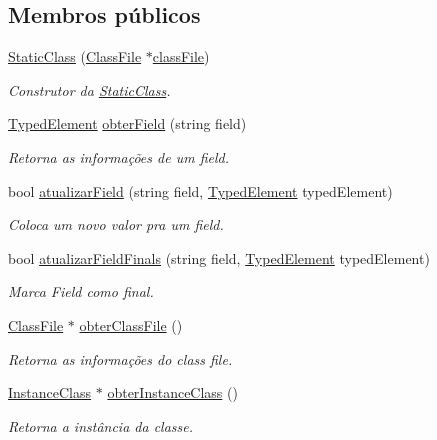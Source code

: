 \subsection*{Membros públicos}
\begin{DoxyCompactItemize}
\item 
\hyperlink{classStaticClass_a6c0e4d8842888a97160f1e815c8e6ac3}{Static\+Class} (\hyperlink{classClassFile}{Class\+File} $\ast$\hyperlink{classStaticClass_a809f1e4dabb3db229a18423f0d0b4a95}{class\+File})
\begin{DoxyCompactList}\small\item\em Construtor da \hyperlink{classStaticClass}{Static\+Class}. \end{DoxyCompactList}\item 
\hyperlink{BasicTypes_8h_a97b332303b1262282599e6ede0637b82}{Typed\+Element} \hyperlink{classStaticClass_ac6d7d4b5b1c315623a8be477c66f38c3}{obter\+Field} (string field)
\begin{DoxyCompactList}\small\item\em Retorna as informações de um field. \end{DoxyCompactList}\item 
bool \hyperlink{classStaticClass_aa0d9a3db46155bf6971476a22c4f2eaa}{atualizar\+Field} (string field, \hyperlink{BasicTypes_8h_a97b332303b1262282599e6ede0637b82}{Typed\+Element} typed\+Element)
\begin{DoxyCompactList}\small\item\em Coloca um novo valor pra um field. \end{DoxyCompactList}\item 
bool \hyperlink{classStaticClass_a4e5d8d70d10266989b2821e10bd8dacc}{atualizar\+Field\+Finals} (string field, \hyperlink{BasicTypes_8h_a97b332303b1262282599e6ede0637b82}{Typed\+Element} typed\+Element)
\begin{DoxyCompactList}\small\item\em Marca Field como final. \end{DoxyCompactList}\item 
\hyperlink{classClassFile}{Class\+File} $\ast$ \hyperlink{classStaticClass_a49b4258a26420be4c6a1a79cdbdc2d5c}{obter\+Class\+File} ()
\begin{DoxyCompactList}\small\item\em Retorna as informações do class file. \end{DoxyCompactList}\item 
\hyperlink{classInstanceClass}{Instance\+Class} $\ast$ \hyperlink{classStaticClass_a2990aa887bcb06eaec53afe467e361ef}{obter\+Instance\+Class} ()
\begin{DoxyCompactList}\small\item\em Retorna a instância da classe. \end{DoxyCompactList}\end{DoxyCompactItemize}
